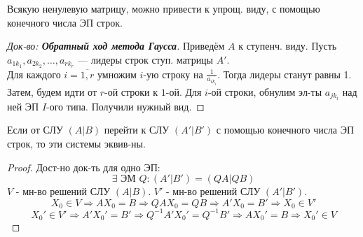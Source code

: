 \begin{theorem}
Всякую ненулевую матрицу, можно привести к упрощ. виду, с помощью конечного числа ЭП строк.
\end{theorem}
\begin{proof}[Док-во: \textbf{Обратный ход метода Гаусса}]
Приведём $A$ к ступенч. виду. Пусть $a_{1 k_1}, a_{2 k_2}, \ldots, a_{r k_r}$ --- лидеры строк ступ. матрицы $A'$. \\
Для каждого $i=\overline{1,r}$ умножим $i$-ую строку на $\frac{1}{a_{i k_i}}$. Тогда лидеры станут равны 1. \\
Затем, будем идти от $r$-ой строки к $1$-ой. Для $i$-ой строки, обнулим эл-ты $a_{j k_i}$ над ней ЭП $I$-ого типа. Получили нужный вид.
\end{proof}
\begin{theorem}
Если от СЛУ $(A | B)$ перейти к СЛУ $(A' | B')$ с помощью конечного числа ЭП строк, то эти системы эквив-ны.
\end{theorem}
\begin{proof}
Дост-но док-ть для одно ЭП:
\[
\exists \text{ ЭМ } Q \colon (A' | B') = (QA | QB)
\]
$V$ - мн-во решений СЛУ $(A | B)$. $V'$ - мн-во решений СЛУ $(A' | B')$. \\
\[
X_0 \in V \Rightarrow AX_0 = B \Rightarrow QAX_0 = QB \Rightarrow A'X_0 = B' \Rightarrow X_0 \in V'
\]
\[
X_0' \in V' \Rightarrow A'X_0' = B' \Rightarrow Q^{-1}A'X_0' = Q^{-1}B' \Rightarrow AX_0' = B \Rightarrow X_0' \in V
\]
\end{proof}

